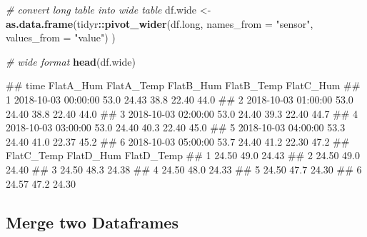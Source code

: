 \documentclass[
  a4paperpaper,
]{book}
\newenvironment{Shaded}{\begin{snugshade}}{\end{snugshade}}
\newcommand{\CommentTok}[1]{\textcolor[rgb]{0.56,0.35,0.01}{\textit{#1}}}
\newcommand{\DataTypeTok}[1]{\textcolor[rgb]{0.13,0.29,0.53}{#1}}
\newcommand{\KeywordTok}[1]{\textcolor[rgb]{0.13,0.29,0.53}{\textbf{#1}}}
\newcommand{\NormalTok}[1]{#1}
\newcommand{\OperatorTok}[1]{\textcolor[rgb]{0.81,0.36,0.00}{\textbf{#1}}}
\newcommand{\StringTok}[1]{\textcolor[rgb]{0.31,0.60,0.02}{#1}}
\let\oldShaded\Shaded
\let\endoldShaded\endShaded
\renewenvironment{Shaded}{\footnotesize\oldShaded}{\endoldShaded}
\let\oldverbatim\verbatim
\let\endoldverbatim\endverbatim
\renewenvironment{verbatim}{\footnotesize\oldverbatim}{\endoldverbatim}
\begin{document}
\begin{Shaded}
\begin{Highlighting}[]
\CommentTok{# convert long table into wide table}
\NormalTok{df.wide <-}\StringTok{ }\KeywordTok{as.data.frame}\NormalTok{(tidyr}\OperatorTok{::}\KeywordTok{pivot_wider}\NormalTok{(df.long,}
                                            \DataTypeTok{names_from =} \StringTok{"sensor"}\NormalTok{,}
                                            \DataTypeTok{values_from =} \StringTok{"value"}\NormalTok{)}
\NormalTok{                         )}

\CommentTok{# wide format}
\KeywordTok{head}\NormalTok{(df.wide)}
\end{Highlighting}
\end{Shaded}

\begin{verbatim}
##                  time FlatA_Hum FlatA_Temp FlatB_Hum FlatB_Temp FlatC_Hum
## 1 2018-10-03 00:00:00      53.0      24.43      38.8      22.40      44.0
## 2 2018-10-03 01:00:00      53.0      24.40      38.8      22.40      44.0
## 3 2018-10-03 02:00:00      53.0      24.40      39.3      22.40      44.7
## 4 2018-10-03 03:00:00      53.0      24.40      40.3      22.40      45.0
## 5 2018-10-03 04:00:00      53.3      24.40      41.0      22.37      45.2
## 6 2018-10-03 05:00:00      53.7      24.40      41.2      22.30      47.2
##   FlatC_Temp FlatD_Hum FlatD_Temp
## 1      24.50      49.0      24.43
## 2      24.50      49.0      24.40
## 3      24.50      48.3      24.38
## 4      24.50      48.0      24.33
## 5      24.50      47.7      24.30
## 6      24.57      47.2      24.30
\end{verbatim}

\newpage

\hypertarget{DATAWRANGLING-MERGE-TWO-DATAFRAMES}{%
\subsection{Merge two Dataframes}\label{DATAWRANGLING-MERGE-TWO-DATAFRAMES}}
\end{document}
